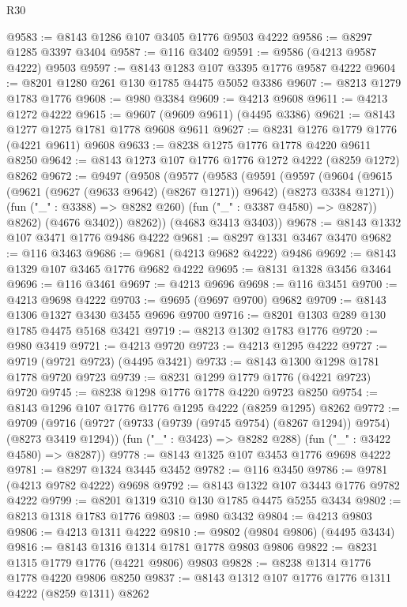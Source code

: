 \begin{lexlean}{R30}
\begin{coremodule}
{{{{{@9583 := @8143 @1286 @107 @3405 @1776 @9503 @4222
@9586 := @8297 @1285 @3397 @3404
@9587 := @116 @3402
@9591 := @9586 (@4213 @9587 @4222) @9503
@9597 := @8143 @1283 @107 @3395 @1776 @9587 @4222
@9604 := @8201 @1280 @261 @130 @1785 @4475 @5052 @3386
@9607 := @8213 @1279 @1783 @1776
@9608 := @980 @3384
@9609 := @4213 @9608
@9611 := @4213 @1272 @4222
@9615 := @9607 (@9609 @9611) (@4495 @3386)
@9621 := @8143 @1277 @1275 @1781 @1778 @9608 @9611
@9627 := @8231 @1276 @1779 @1776 (@4221 @9611) @9608
@9633 := @8238 @1275 @1776 @1778 @4220 @9611 @8250
@9642 := @8143 @1273 @107 @1776 @1776 @1272 @4222 (@8259 @1272) @8262
@9672 := @9497
    (@9508
      (@9577
        (@9583
          (@9591
            (@9597
              (@9604
                (@9615 (@9621 (@9627 (@9633 @9642) (@8267 @1271)) @9642) (@8273 @3384 @1271))
                (fun ("_" : @3388) => @8282 @260)
                (fun ("_" : @3387 @4580) => @8287))
              @8262)
            (@4676 @3402))
          @8262))
      (@4683 @3413 @3403))
@9678 := @8143 @1332 @107 @3471 @1776 @9486 @4222
@9681 := @8297 @1331 @3467 @3470
@9682 := @116 @3463
@9686 := @9681 (@4213 @9682 @4222) @9486
@9692 := @8143 @1329 @107 @3465 @1776 @9682 @4222
@9695 := @8131 @1328 @3456 @3464
@9696 := @116 @3461
@9697 := @4213 @9696
@9698 := @116 @3451
@9700 := @4213 @9698 @4222
@9703 := @9695 (@9697 @9700) @9682
@9709 := @8143 @1306 @1327 @3430 @3455 @9696 @9700
@9716 := @8201 @1303 @289 @130 @1785 @4475 @5168 @3421
@9719 := @8213 @1302 @1783 @1776
@9720 := @980 @3419
@9721 := @4213 @9720
@9723 := @4213 @1295 @4222
@9727 := @9719 (@9721 @9723) (@4495 @3421)
@9733 := @8143 @1300 @1298 @1781 @1778 @9720 @9723
@9739 := @8231 @1299 @1779 @1776 (@4221 @9723) @9720
@9745 := @8238 @1298 @1776 @1778 @4220 @9723 @8250
@9754 := @8143 @1296 @107 @1776 @1776 @1295 @4222 (@8259 @1295) @8262
@9772 := @9709
    (@9716
      (@9727 (@9733 (@9739 (@9745 @9754) (@8267 @1294)) @9754) (@8273 @3419 @1294))
      (fun ("_" : @3423) => @8282 @288)
      (fun ("_" : @3422 @4580) => @8287))
@9778 := @8143 @1325 @107 @3453 @1776 @9698 @4222
@9781 := @8297 @1324 @3445 @3452
@9782 := @116 @3450
@9786 := @9781 (@4213 @9782 @4222) @9698
@9792 := @8143 @1322 @107 @3443 @1776 @9782 @4222
@9799 := @8201 @1319 @310 @130 @1785 @4475 @5255 @3434
@9802 := @8213 @1318 @1783 @1776
@9803 := @980 @3432
@9804 := @4213 @9803
@9806 := @4213 @1311 @4222
@9810 := @9802 (@9804 @9806) (@4495 @3434)
@9816 := @8143 @1316 @1314 @1781 @1778 @9803 @9806
@9822 := @8231 @1315 @1779 @1776 (@4221 @9806) @9803
@9828 := @8238 @1314 @1776 @1778 @4220 @9806 @8250
@9837 := @8143 @1312 @107 @1776 @1776 @1311 @4222 (@8259 @1311) @8262
}}}}}
\end{coremodule}
\end{lexlean}
